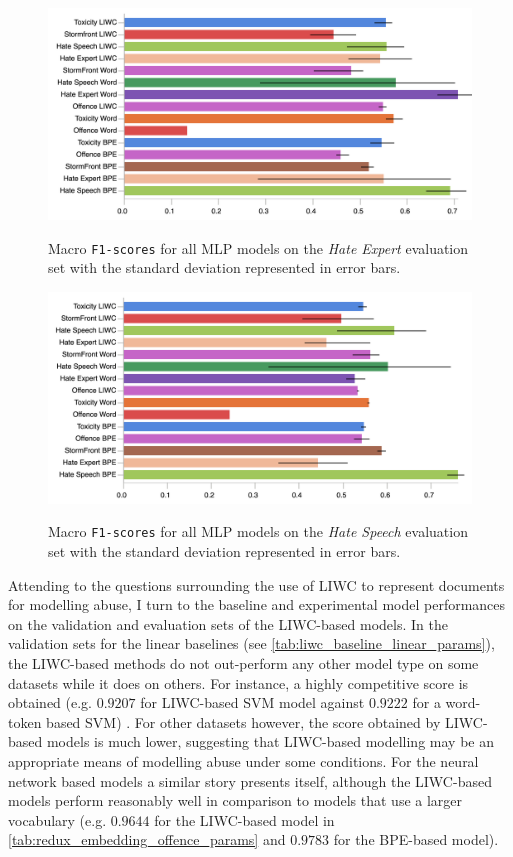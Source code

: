 \begin{figure}
\begin{minipage}{\textwidth}
\centering
    \includegraphics[width=\textwidth]{all_mlp_waseem_test.pdf}
    \caption{Macro \texttt{F1-scores} for all MLP models on the \textit{Hate Expert} evaluation set with the standard deviation represented in error bars.}
    \label{fig:waseem_mlp_test}
    \vfill
      \includegraphics[width=\textwidth]{all_mlp_waseem_hovy_test.pdf}
  \caption{Macro \texttt{F1-scores} for all MLP models on the \textit{Hate Speech} evaluation set with the standard deviation represented in error bars.}
  \label{fig:waseem_hovy_mlp_test}
\end{minipage}
\end{figure}

Attending to the questions surrounding the use of LIWC to represent documents for modelling abuse, I turn to the baseline and experimental model performances on the validation and evaluation sets of the LIWC-based models.
In the validation sets for the linear baselines (see \cref{tab:liwc_baseline_linear_params}), the LIWC-based methods do not out-perform any other model type on some datasets while it does on others.
For instance, a highly competitive score is obtained (e.g. $0.9207$ for LIWC-based SVM model against $0.9222$ for a word-token based SVM) .
For other datasets however, the score obtained by LIWC-based models is much lower, suggesting that LIWC-based modelling may be an appropriate means of modelling abuse under some conditions.
For the neural network based models a similar story presents itself, although the LIWC-based models perform reasonably well in comparison to models that use a larger vocabulary (e.g. $0.9644$ for the LIWC-based model in \cref{tab:redux_embedding_offence_params} and $0.9783$ for the BPE-based model).

